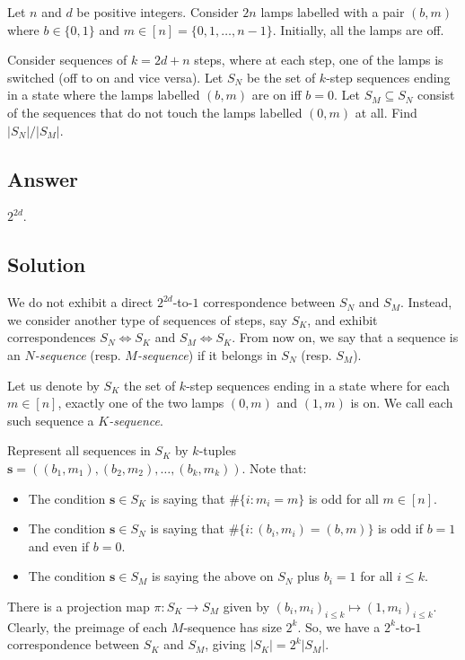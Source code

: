 Let $n$ and $d$ be positive integers.
Consider $2n$ lamps labelled with a pair $(b, m)$ where $b \in \{0, 1\}$ and $m \in [n] = \{0, 1, \ldots, n - 1\}$.
Initially, all the lamps are off.

Consider sequences of $k = 2d + n$ steps, where at each step, one of the lamps is switched (off to on and vice versa).
Let $S_N$ be the set of $k$-step sequences ending in a state where the lamps labelled $(b, m)$ are on iff $b = 0$.
Let $S_M \subseteq S_N$ consist of the sequences that do not touch the lamps labelled $(0, m)$ at all.
Find $|S_N|/|S_M|$.



\subsection*{Answer}

$2^{2d}$.



\subsection*{Solution}

We do not exhibit a direct $2^{2d}$-to-$1$ correspondence between $S_N$ and $S_M$.
Instead, we consider another type of sequences of steps, say $S_K$, and exhibit correspondences $S_N \iff S_K$ and $S_M \iff S_K$.
From now on, we say that a sequence is an \emph{$N$-sequence} (resp. \emph{$M$-sequence}) if it belongs in $S_N$ (resp. $S_M$).

Let us denote by $S_K$ the set of $k$-step sequences ending in a state where for each $m \in [n]$, exactly one of the two lamps $(0, m)$ and $(1, m)$ is on.
We call each such sequence a \emph{$K$-sequence}.

Represent all sequences in $S_K$ by $k$-tuples $\mathbf{s} = ((b_1, m_1), (b_2, m_2), \ldots, (b_k, m_k))$.
Note that:
\begin{itemize}
    \item   The condition $\mathbf{s} \in S_K$ is saying that $\#\{i : m_i = m\}$ is odd for all $m \in [n]$.
    \item   The condition $\mathbf{s} \in S_N$ is saying that $\#\{i : (b_i, m_i) = (b, m)\}$ is odd if $b = 1$ and even if $b = 0$.
    \item   The condition $\mathbf{s} \in S_M$ is saying the above on $S_N$ plus $b_i = 1$ for all $i \leq k$.
\end{itemize}

There is a projection map $\pi : S_K \to S_M$ given by $(b_i, m_i)_{i \leq k} \mapsto (1, m_i)_{i \leq k}$.
Clearly, the preimage of each $M$-sequence has size $2^k$.
So, we have a $2^k$-to-$1$ correspondence between $S_K$ and $S_M$, giving $|S_K| = 2^k |S_M|$.

